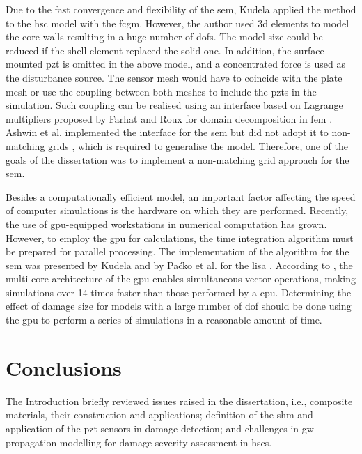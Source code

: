 \documentclass[11pt,a4paper,final]{report}
\theoremstyle{plain}
\begin{document}
Due to the fast convergence and flexibility of the \ac{sem}, Kudela \cite{kudela2016parallel} applied the method to the \ac{hsc} model with the \ac{fcgm}.
However, the author used \ac{3d} elements to model the core walls resulting in a huge number of \acp{dof}.
The model size could be reduced if the shell element replaced the solid one.
In addition, the surface-mounted \ac{pzt} is omitted in the above model, and a concentrated force is used as the disturbance source.
The sensor mesh would have to coincide with the plate mesh or use the coupling between both meshes to include the \acp{pzt} in the simulation.
Such coupling can be realised using an interface based on Lagrange multipliers proposed by Farhat and Roux for domain decomposition in \ac{fem} \cite{farhat1991method}.
Ashwin et al. implemented the interface for the \ac{sem} but did not adopt it to non-matching grids \cite{ashwin2014formulation}, which is required to generalise the model.
Therefore, one of the goals of the dissertation was to implement a non-matching grid approach for the \ac{sem}.

Besides a computationally efficient model, an important factor affecting the speed of computer simulations is the hardware on which they are performed.
Recently, the use of \ac{gpu}-equipped workstations in numerical computation has grown.
However, to employ the \ac{gpu} for calculations, the time integration algorithm must be prepared for parallel processing.
The implementation of the algorithm for the \ac{sem} was presented by Kudela \cite{kudela2016parallel} and by Paćko et al. for the \ac{lisa} \cite{packo2012lamb}.
According to \cite{kudela2016parallel}, the multi-core architecture of the \ac{gpu} enables simultaneous vector operations, making simulations over 14 times faster than those performed by a \ac{cpu}.
Determining the effect of damage size for models with a large number of \ac{dof} should be done using the \ac{gpu} to perform a series of simulations in a reasonable amount of time. 
\section{Conclusions}
\label{sec:conclusionsIntro}

The Introduction briefly reviewed issues raised in the dissertation, i.e., composite materials, their construction and applications; definition of the \ac{shm} and application of the \ac{pzt} sensors in damage detection; and challenges in \ac{gw} propagation modelling for damage severity assessment in \acp{hsc}.
\end{document}
